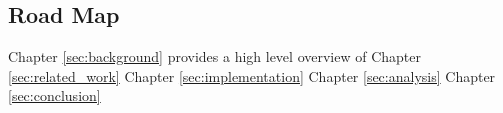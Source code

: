 \subsection{Road Map}

Chapter \ref{sec:background} provides a high level overview of 
Chapter \ref{sec:related_work}
Chapter \ref{sec:implementation}
Chapter \ref{sec:analysis}
Chapter \ref{sec:conclusion}